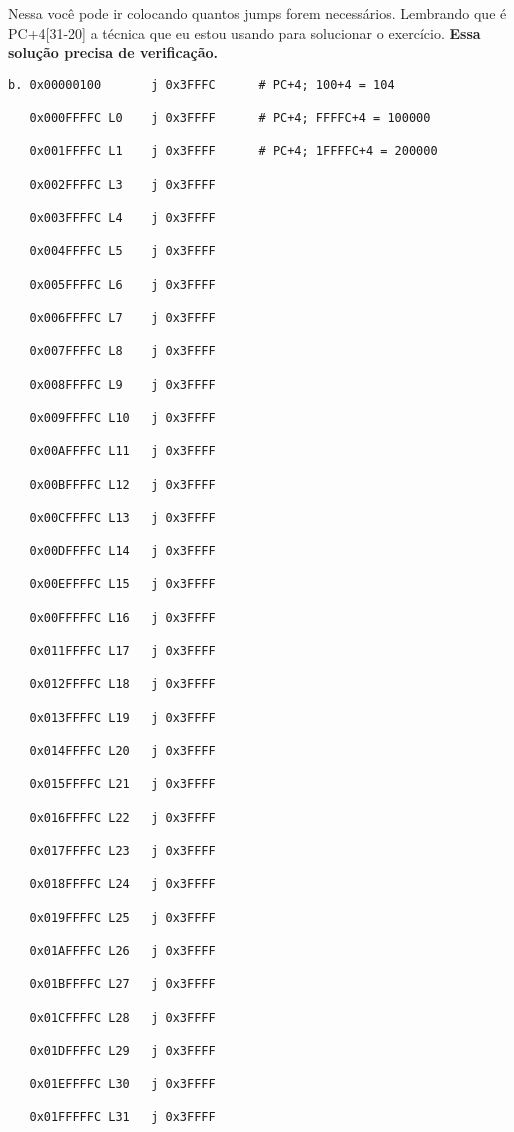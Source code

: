 \documentclass{article}
\begin{document}
Nessa você pode ir colocando quantos jumps forem necessários. Lembrando que é 
PC+4[31-20] a técnica que eu estou usando para solucionar o exercício. 
{\bfseries Essa solução precisa de verificação.}

\begin{verbatim}
b. 0x00000100       j 0x3FFFC      # PC+4; 100+4 = 104

   0x000FFFFC L0    j 0x3FFFF      # PC+4; FFFFC+4 = 100000

   0x001FFFFC L1    j 0x3FFFF      # PC+4; 1FFFFC+4 = 200000

   0x002FFFFC L3    j 0x3FFFF

   0x003FFFFC L4    j 0x3FFFF

   0x004FFFFC L5    j 0x3FFFF

   0x005FFFFC L6    j 0x3FFFF

   0x006FFFFC L7    j 0x3FFFF

   0x007FFFFC L8    j 0x3FFFF

   0x008FFFFC L9    j 0x3FFFF

   0x009FFFFC L10   j 0x3FFFF

   0x00AFFFFC L11   j 0x3FFFF

   0x00BFFFFC L12   j 0x3FFFF

   0x00CFFFFC L13   j 0x3FFFF

   0x00DFFFFC L14   j 0x3FFFF

   0x00EFFFFC L15   j 0x3FFFF

   0x00FFFFFC L16   j 0x3FFFF

   0x011FFFFC L17   j 0x3FFFF

   0x012FFFFC L18   j 0x3FFFF

   0x013FFFFC L19   j 0x3FFFF

   0x014FFFFC L20   j 0x3FFFF

   0x015FFFFC L21   j 0x3FFFF

   0x016FFFFC L22   j 0x3FFFF

   0x017FFFFC L23   j 0x3FFFF

   0x018FFFFC L24   j 0x3FFFF

   0x019FFFFC L25   j 0x3FFFF

   0x01AFFFFC L26   j 0x3FFFF

   0x01BFFFFC L27   j 0x3FFFF

   0x01CFFFFC L28   j 0x3FFFF

   0x01DFFFFC L29   j 0x3FFFF

   0x01EFFFFC L30   j 0x3FFFF

   0x01FFFFFC L31   j 0x3FFFF


\end{verbatim}
\end{document}
